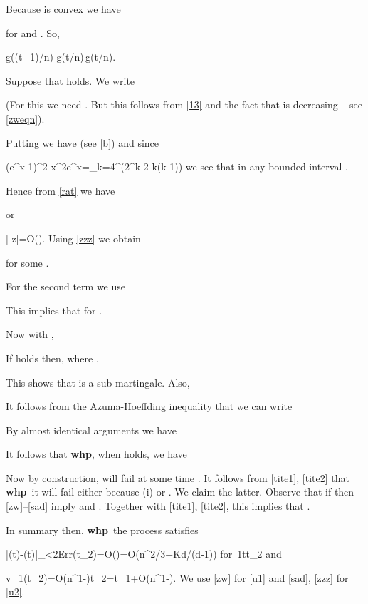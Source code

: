 \documentclass[11pt]{article}
\def\g{\gamma}
\def\z{\zeta}
\def\whp{{\bf whp}}
\newcommand{\ignore}[1]{}
\def\vv{\vec{v}}
\def\yy{\vec{y}}
\newcommand{\brac}[1]{\left(#1\right)}
\newcommand{\bfrac}[2]{\brac{\frac{#1}{#2}}}
\newcommand{\beq}[1]{}
\begin{document}
Because  is convex we have 

for  and . So,
\beq{gt}
g((t+1)/n)-g(t/n)\geq {}\,g(t/n).
\eeq

Suppose that  holds. We write

(For this we need . But this follows from \eqref{13} and the fact that  is decreasing -- see \eqref{zweqn}).

Putting  
we have (see \eqref{b})  and since
\beq{diff}
(e^x-1)^2-x^2e^x=\sum_{k=4}^\infty(2^k-2-k(k-1))
\eeq
we see that  in any bounded interval . 

Hence from \eqref{rat} we have

or
\beq{zzz}
|\z-z|=O\bfrac{Err(t)}{v}.
\eeq
Using \eqref{zzz} we obtain

for some .

For the second term we use 
 
This implies that  for .

Now with ,

If  holds then, where ,


This shows that  is a sub-martingale. Also,



It follows from the Azuma-Hoeffding inequality that we can write

By almost identical arguments we have

It follows that \whp, when  holds, we have

Now by construction,  will fail at some time . It follows from \eqref{tite1}, \eqref{tite2} that \whp\ 
it will fail either because (i)  or . We claim the latter.
Observe that if  then \eqref{zw}--\eqref{sad} imply  and
. Together with \eqref{tite1}, \eqref{tite2}, this implies that .

In summary then, \whp\, the process satisfies
\beq{u1}
|\vv(t)-\yy(t)|_\infty<2Err(t_2)=O\bfrac{n^{2/3}}{(1-t_2/n)^K}=O(n^{2/3+Kd\g/(d-1)}) \qquad\qquad for\ 1\leq t\leq t_2
\eeq
and
\beq{u2}
v_1(t_2)=O(n^{1-\g})t_2=t_1+O(n^{1-\g}).
\eeq
We use \eqref{zw} for \eqref{u1} and \eqref{sad}, \eqref{zzz} for \eqref{u2}.


\ignore{
\section{Growth of }
When  is small, we see that \eqref{dv1} becomes

after substituting for  using \eqref{actual}.

This is positive for small . This is because our differential equations are only good for Phase 1.
In Phase 2, vertices on the left lose edges. I think we observed this already. To handle Karp-Sipser in
Phase 2 we need to keep track of the number of vertices on the left with degree  for . So we
need  variables  and  equations where the extra two equations are needed to keep track of the growth of
 and .
}
\end{document}
